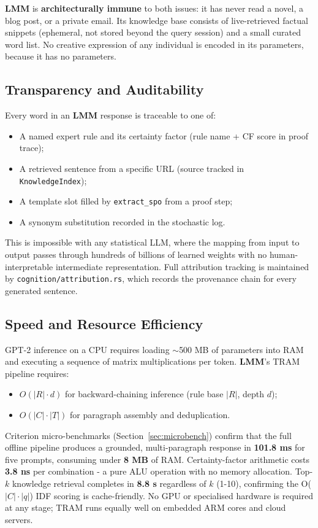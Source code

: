 \documentclass[11pt,a4paper]{article}
\newcommand{\lmm}{\texorpdfstring{%
  \textbf{\color{lmmAccent}LMM}}{LMM}}
\begin{document}
\lmm{} is \textbf{architecturally immune} to both issues: it has never read a novel, a blog
post, or a private email. Its knowledge base consists of live-retrieved factual snippets
(ephemeral, not stored beyond the query session) and a small curated word list. No creative
expression of any individual is encoded in its parameters, because it has no parameters.

\subsection{Transparency and Auditability}

Every word in an \lmm{} response is traceable to one of:
\begin{itemize}[noitemsep,topsep=4pt]
  \item A named expert rule and its certainty factor (rule name + CF score in proof trace);
  \item A retrieved sentence from a specific URL (source tracked in \texttt{KnowledgeIndex});
  \item A template slot filled by \texttt{extract\_spo} from a proof step;
  \item A synonym substitution recorded in the stochastic log.
\end{itemize}
This is impossible with any statistical LLM, where the mapping from input to output passes
through hundreds of billions of learned weights with no human-interpretable intermediate
representation. Full attribution tracking is maintained by \texttt{cognition/attribution.rs},
which records the provenance chain for every generated sentence.

\subsection{Speed and Resource Efficiency}

GPT-2 inference on a CPU requires loading $\sim$500 MB of parameters into RAM and executing a
sequence of matrix multiplications per token. \lmm{}'s TRAM pipeline requires:
\begin{itemize}[noitemsep,topsep=4pt]
  \item $O(|R| \cdot d)$ for backward-chaining inference (rule base $|R|$, depth $d$);
  \item $O(|C| \cdot |T|)$ for paragraph assembly and deduplication.
\end{itemize}
Criterion micro-benchmarks (Section~\ref{sec:microbench}) confirm that the full offline
pipeline produces a grounded, multi-paragraph response in \textbf{101.8 ms} for five
prompts, consuming under \textbf{8 MB} of RAM.
Certainty-factor arithmetic costs \textbf{3.8 ns} per combination - a pure ALU operation
with no memory allocation. Top-$k$ knowledge retrieval completes in \textbf{8.8 \textmu s}
regardless of $k$ (1-10), confirming the O($|C| \cdot |q|$) IDF scoring is cache-friendly.
No GPU or specialised hardware is required at any stage; TRAM runs equally well on
embedded ARM cores and cloud servers.
\end{document}
